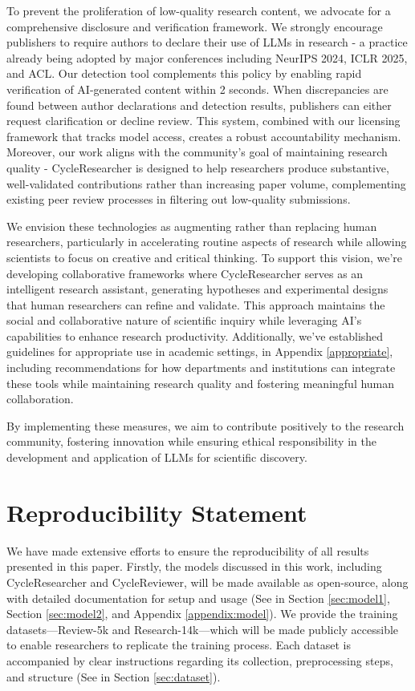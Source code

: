 \documentclass{article} %
\begin{document}
To prevent the proliferation of low-quality research content, we advocate for a comprehensive disclosure and verification framework. We strongly encourage publishers to require authors to declare their use of LLMs in research - a practice already being adopted by major conferences including NeurIPS 2024, ICLR 2025, and ACL. Our detection tool complements this policy by enabling rapid verification of AI-generated content within 2 seconds. When discrepancies are found between author declarations and detection results, publishers can either request clarification or decline review. This system, combined with our licensing framework that tracks model access, creates a robust accountability mechanism. Moreover, our work aligns with the community's goal of maintaining research quality - CycleResearcher is designed to help researchers produce substantive, well-validated contributions rather than increasing paper volume, complementing existing peer review processes in filtering out low-quality submissions.



We envision these technologies as augmenting rather than replacing human researchers, particularly in accelerating routine aspects of research while allowing scientists to focus on creative and critical thinking. To support this vision, we're developing collaborative frameworks where CycleResearcher serves as an intelligent research assistant, generating hypotheses and experimental designs that human researchers can refine and validate. This approach maintains the social and collaborative nature of scientific inquiry while leveraging AI's capabilities to enhance research productivity. Additionally, we've established guidelines for appropriate use in academic settings, in Appendix \ref{appropriate}, including recommendations for how departments and institutions can integrate these tools while maintaining research quality and fostering meaningful human collaboration.

By implementing these measures, we aim to contribute positively to the research community, fostering innovation while ensuring ethical responsibility in the development and application of LLMs for scientific discovery.

\section*{Reproducibility Statement}

We have made extensive efforts to ensure the reproducibility of all results presented in this paper. Firstly, the models discussed in this work, including CycleResearcher and CycleReviewer, will be made available as open-source, along with detailed documentation for setup and usage (See in Section \ref{sec:model1}, Section \ref{sec:model2}, and Appendix \ref{appendix:model}). We provide the training datasets—Review-5k and Research-14k—which will be made publicly accessible to enable researchers to replicate the training process. Each dataset is accompanied by clear instructions regarding its collection, preprocessing steps, and structure (See in Section \ref{sec:dataset}). 
\end{document}
